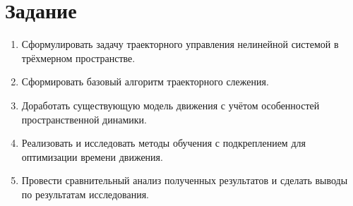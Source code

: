 
\section*{Задание}

\begin{enumerate}
    \item Сформулировать задачу траекторного управления нелинейной системой в трёхмерном пространстве.
    \item Сформировать базовый алгоритм траекторного слежения.
    \item Доработать существующую модель движения с учётом особенностей пространственной динамики.
    \item Реализовать и исследовать методы обучения с подкреплением для оптимизации времени движения.
    \item Провести сравнительный анализ полученных результатов и сделать выводы по результатам исследования.
\end{enumerate}